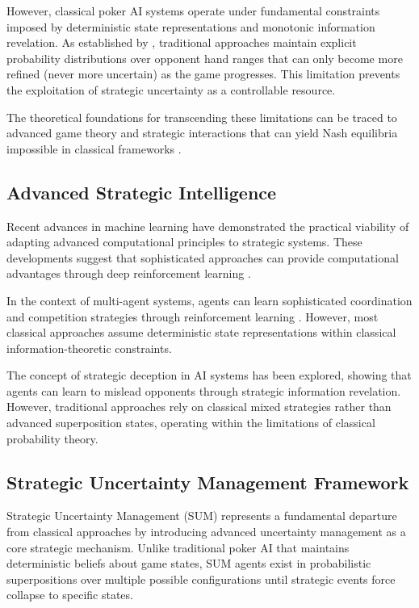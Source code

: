 \documentclass[11pt,a4paper]{article}
\begin{document}
However, classical poker AI systems operate under fundamental constraints imposed by deterministic state representations and monotonic information revelation. As established by \citet{mcmahan2003planning}, traditional approaches maintain explicit probability distributions over opponent hand ranges that can only become more refined (never more uncertain) as the game progresses. This limitation prevents the exploitation of strategic uncertainty as a controllable resource.

The theoretical foundations for transcending these limitations can be traced to advanced game theory and strategic interactions that can yield Nash equilibria impossible in classical frameworks \citep{nash1950equilibrium}.

\subsection{Advanced Strategic Intelligence}

Recent advances in machine learning have demonstrated the practical viability of adapting advanced computational principles to strategic systems. These developments suggest that sophisticated approaches can provide computational advantages through deep reinforcement learning \citep{mnih2015human}.

In the context of multi-agent systems, agents can learn sophisticated coordination and competition strategies through reinforcement learning \citep{foerster2016counterfactual}. However, most classical approaches assume deterministic state representations within classical information-theoretic constraints.

The concept of strategic deception in AI systems has been explored, showing that agents can learn to mislead opponents through strategic information revelation. However, traditional approaches rely on classical mixed strategies rather than advanced superposition states, operating within the limitations of classical probability theory.

\subsection{Strategic Uncertainty Management Framework}

Strategic Uncertainty Management (SUM) represents a fundamental departure from classical approaches by introducing advanced uncertainty management as a core strategic mechanism. Unlike traditional poker AI that maintains deterministic beliefs about game states, SUM agents exist in probabilistic superpositions over multiple possible configurations until strategic events force collapse to specific states.
\end{document}
